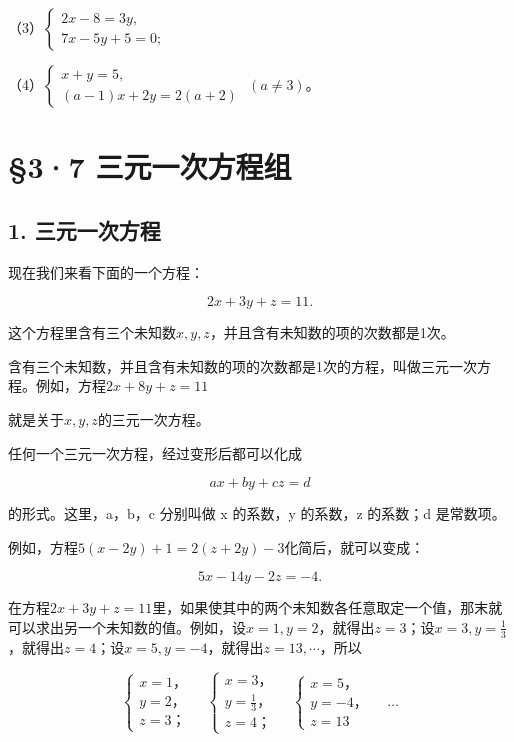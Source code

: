 （3）\(\left\{ \begin{array}{l} 2x - 8 = 3y, \\ 7x - 5y + 5 = 0; \end{array} \right.\)

（4）\(\left\{ \begin{array}{l} x + y = 5, \\ (a - 1)x + 2y = 2(a + 2) \end{array} \right.\) \((a \neq 3)\)。

\section{§3·7 三元一次方程组}

\subsection{1. 三元一次方程}

现在我们来看下面的一个方程：

\[
2 x + 3 y + z = 11.
\]

这个方程里含有三个未知数\(x, y, z\)，并且含有未知数的项的次数都是1次。

含有三个未知数，并且含有未知数的项的次数都是1次的方程，叫做三元一次方程。例如，方程\(2x + 8y + z = 11\)

就是关于\(x, y, z\)的三元一次方程。

任何一个三元一次方程，经过变形后都可以化成

\[
a x + b y + c z = d
\]

的形式。这里，a，b，c 分别叫做 x 的系数，y 的系数，z 的系数；d
是常数项。

例如，方程\(5(x - 2y) + 1 = 2(z + 2y) - 3\)化简后，就可以变成：

\[
5 x - 14 y - 2 z = - 4.
\]

在方程\(2x + 3y + z = 11\)里，如果使其中的两个未知数各任意取定一个值，那末就可以求出另一个未知数的值。例如，设\(x = 1, y = 2\)，就得出\(z = 3\)；设\(x = 3, y = \frac{1}{3}\)，就得出\(z = 4\)；设\(x = 5, y = -4\)，就得出\(z = 13, \cdots\)，所以

\[
\left\{ \begin{array}{l} x = 1\text{，} \\ y = 2\text{，} \\ z = 3\text{；} \end{array} \right. \quad \left\{ \begin{array}{l} x = 3\text{，} \\ y = \frac{1}{3}\text{，} \\ z = 4\text{；} \end{array} \right. \quad \left\{ \begin{array}{l} x = 5\text{，} \\ y = - 4\text{，} \\ z = 13 \end{array} \right. \quad \dots
\]


